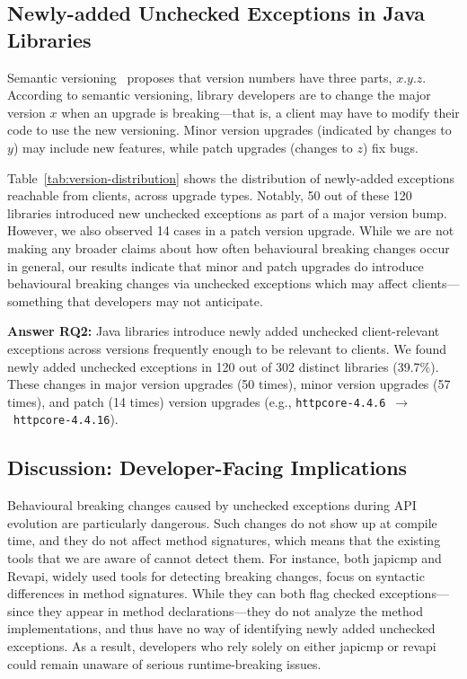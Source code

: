 \subsection{Newly-added Unchecked Exceptions in Java Libraries}
Semantic versioning~\cite{preston-werner23:_seman_version} proposes that version numbers have three parts, $x.y.z$. According to semantic versioning, library developers are to change the major version $x$ when an upgrade is breaking---that is, a client may have to modify their code to use the new versioning. Minor version upgrades (indicated by changes to $y$) may include new features, while patch upgrades (changes to $z$) fix bugs.

Table~\ref{tab:version-distribution} shows the distribution of newly-added exceptions reachable from clients, across upgrade types. Notably, 50 out of these 120 libraries introduced new unchecked exceptions as part of a major version bump. However, we also observed 14 cases in a patch version upgrade. While we are not making any broader claims about how often behavioural breaking changes occur in general, our results indicate that minor and patch upgrades do introduce behavioural breaking changes via unchecked exceptions which may affect clients—something that developers may not anticipate.

\vspace{1em}
\begin{tcolorbox}[colback=gray!10, colframe=black]
\textbf{Answer RQ2:} Java libraries introduce newly added unchecked client-relevant exceptions across versions frequently enough to be relevant to clients. We found newly added unchecked exceptions in 120 out of 302 distinct libraries (39.7\%). These changes in major version upgrades (50 times), minor version upgrades (57 times), and patch (14 times) version upgrades (e.g., \texttt{httpcore-4.4.6}~$\rightarrow$~\texttt{httpcore-4.4.16}).
\end{tcolorbox}
\vspace{1em}

\subsection{Discussion: Developer-Facing Implications}

Behavioural breaking changes caused by unchecked exceptions during API evolution are particularly dangerous. Such changes do not show up at compile time, and they do not affect method signatures, which means that the existing tools that we are aware of cannot detect them. For instance, both japicmp and Revapi, widely used tools for detecting breaking changes, focus on syntactic differences in method signatures. While they can both flag checked exceptions—since they appear in method declarations—they do not analyze the method implementations, and thus have no way of identifying newly added unchecked exceptions. As a result, developers who rely solely on either japicmp or revapi could remain unaware of serious runtime-breaking issues.

